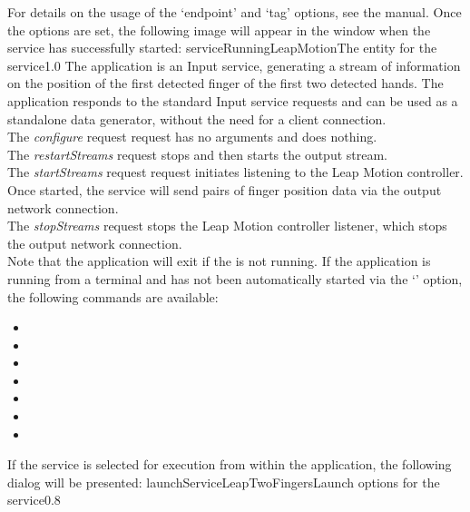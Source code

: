 For details on the usage of the `endpoint' and `tag' options, see the \emph{\CMU} manual.
Once the options are set, the following image will appear in the \emph{\CMU} window when
the service has successfully started:
%
{serviceRunningLeapMotion}{The \emph{\CMU} entity for the \emph{\LMI} service}{1.0}
\secondaryEnd
\primaryEnd
{}
The  application is an Input service,
generating a stream of information on the position of the first detected finger of the
first two detected hands.
The application responds to the standard Input service requests and can be used as a
standalone data generator, without the need for a client connection.\\

The \emph{configure} request request has no arguments and does nothing.\\

The \emph{restartStreams} request stops and then starts the output stream.\\

The \emph{startStreams} request request initiates listening to the Leap Motion controller.
Once started, the service will send pairs of finger position data via the output \yarp{}
network connection.\\

The \emph{stopStreams} request stops the Leap Motion controller listener, which stops the
output \yarp{} network connection.\\ 

Note that the application will exit if the \emph{\RS} is not running.
\insertAppParameters
\insertTagDescription{\LTFI}
\insertInputServiceComment
\condPage{}
If the application is running from a terminal and has not been automatically started via
the `' option, the following commands are available:
\begin{itemize}
\item{}
\item\exSp{}
\item\exSp{}
\item\exSp{}
\item\exSp{}
\item\exSp{}
\item\exSp{}
\end{itemize}
\secondaryEnd
\condPage
{}
If the service is selected for execution from within the \emph{\CMU} application, the
following dialog will be presented:
%
{launchServiceLeapTwoFingers}{Launch options for the \emph{\LTFI} service}{0.8}

